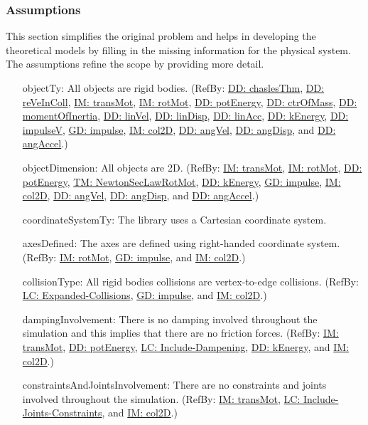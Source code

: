 \documentclass[12pt]{article}
\begin{document}
\subsubsection{Assumptions}
\label{Sec:Assumps}
This section simplifies the original problem and helps in developing the theoretical models by filling in the missing information for the physical system. The assumptions refine the scope by providing more detail.

\begin{itemize}
\item[objectTy:\phantomsection\label{assumpOT}]{All objects are rigid bodies. (RefBy: \hyperref[DD:chaslesThm]{DD: chaslesThm}, \hyperref[DD:reVeInColl]{DD: reVeInColl}, \hyperref[IM:transMot]{IM: transMot}, \hyperref[IM:rotMot]{IM: rotMot}, \hyperref[DD:potEnergy]{DD: potEnergy}, \hyperref[DD:ctrOfMass]{DD: ctrOfMass}, \hyperref[DD:momentOfInertia]{DD: momentOfInertia}, \hyperref[DD:linVel]{DD: linVel}, \hyperref[DD:linDisp]{DD: linDisp}, \hyperref[DD:linAcc]{DD: linAcc}, \hyperref[DD:kEnergy]{DD: kEnergy}, \hyperref[DD:impulseV]{DD: impulseV}, \hyperref[GD:impulse]{GD: impulse}, \hyperref[IM:col2D]{IM: col2D}, \hyperref[DD:angVel]{DD: angVel}, \hyperref[DD:angDisp]{DD: angDisp}, and \hyperref[DD:angAccel]{DD: angAccel}.)}
\item[objectDimension:\phantomsection\label{assumpOD}]{All objects are 2D. (RefBy: \hyperref[IM:transMot]{IM: transMot}, \hyperref[IM:rotMot]{IM: rotMot}, \hyperref[DD:potEnergy]{DD: potEnergy}, \hyperref[TM:NewtonSecLawRotMot]{TM: NewtonSecLawRotMot}, \hyperref[DD:kEnergy]{DD: kEnergy}, \hyperref[GD:impulse]{GD: impulse}, \hyperref[IM:col2D]{IM: col2D}, \hyperref[DD:angVel]{DD: angVel}, \hyperref[DD:angDisp]{DD: angDisp}, and \hyperref[DD:angAccel]{DD: angAccel}.)}
\item[coordinateSystemTy:\phantomsection\label{assumpCST}]{The library uses a Cartesian coordinate system.}
\item[axesDefined:\phantomsection\label{assumpAD}]{The axes are defined using right-handed coordinate system. (RefBy: \hyperref[IM:rotMot]{IM: rotMot}, \hyperref[GD:impulse]{GD: impulse}, and \hyperref[IM:col2D]{IM: col2D}.)}
\item[collisionType:\phantomsection\label{assumpCT}]{All rigid bodies collisions are vertex-to-edge collisions. (RefBy: \hyperref[lcEC]{LC: Expanded-Collisions}, \hyperref[GD:impulse]{GD: impulse}, and \hyperref[IM:col2D]{IM: col2D}.)}
\item[dampingInvolvement:\phantomsection\label{assumpDI}]{There is no damping involved throughout the simulation and this implies that there are no friction forces. (RefBy: \hyperref[IM:transMot]{IM: transMot}, \hyperref[DD:potEnergy]{DD: potEnergy}, \hyperref[lcID]{LC: Include-Dampening}, \hyperref[DD:kEnergy]{DD: kEnergy}, and \hyperref[IM:col2D]{IM: col2D}.)}
\item[constraintsAndJointsInvolvement:\phantomsection\label{assumpCAJI}]{There are no constraints and joints involved throughout the simulation. (RefBy: \hyperref[IM:transMot]{IM: transMot}, \hyperref[lcIJC]{LC: Include-Joints-Constraints}, and \hyperref[IM:col2D]{IM: col2D}.)}
\end{itemize}
\end{document}
